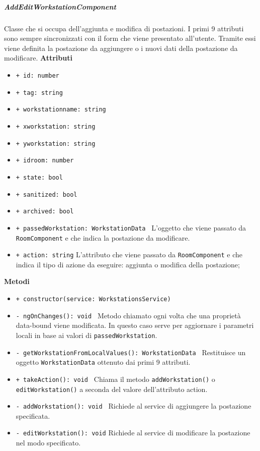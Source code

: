 \subparagraph{AddEditWorkstationComponent}
Classe che si occupa dell'aggiunta e modifica di postazioni. I primi 9 attributi sono sempre sincronizzati con il form che viene presentato all'utente. Tramite essi viene definita la postazione da aggiungere o i nuovi dati della postazione da modificare.\newline
\textbf{Attributi}
\begin{itemize}
	\item \texttt{+ id: number } 
	\item \texttt{+ tag: string } 
	\item \texttt{+ workstationname: string } 
	\item \texttt{+ xworkstation: string } 
	\item \texttt{+ yworkstation: string } 
	\item \texttt{+ idroom: number } 
	\item \texttt{+ state: bool } 
	\item \texttt{+ sanitized: bool } 
	\item \texttt{+ archived: bool } 
	\item \texttt{+ passedWorkstation: WorkstationData } \newline
	L'oggetto che viene passato da \texttt{RoomComponent} e che indica la postazione da modificare.
	\item \texttt{+ action: string} \newline
	L'attributo che viene passato da \texttt{RoomComponent} e che indica il tipo di azione da eseguire: aggiunta o modifica della postazione;
\end{itemize}
\textbf{Metodi}
\begin{itemize}
	\item \texttt{+ constructor(service: WorkstationsService) }
	\item \texttt{- ngOnChanges(): void } \newline
	Metodo chiamato ogni volta che una proprietà data-bound viene modificata. In questo caso serve per aggiornare i parametri locali in base ai valori di \texttt{passedWorkstation}.
	\item \texttt{- getWorkstationFromLocalValues(): WorkstationData } \newline
	Restituisce un oggetto \texttt{WorkstationData} ottenuto dai primi 9 attributi.
	\item \texttt{+ takeAction(): void } \newline
	Chiama il metodo \texttt{addWorkstation()} o \texttt{editWorkstation()} a seconda del valore dell'attributo action.
	\item \texttt{- addWorkstation(): void } \newline
	Richiede al service di aggiungere la postazione specificata.
	\item \texttt{- editWorkstation(): void} \newline
	Richiede al service di modificare la postazione nel modo specificato.
	
\end{itemize}
